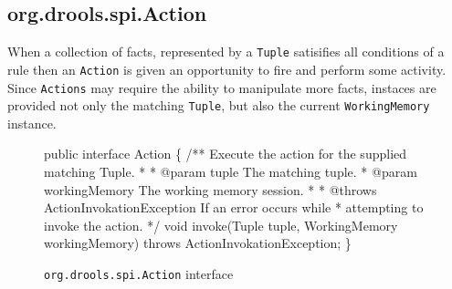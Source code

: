 \subsection{org.drools.spi.Action}

When a collection of facts, represented by a \verb|Tuple| satisifies
all conditions of a rule then an \verb|Action| is given an opportunity
to fire and perform some activity.  Since \verb|Actions| may require
the ability to manipulate more facts, instaces are provided not only
the matching \verb|Tuple|, but also the current \verb|WorkingMemory|
instance.

\begin{figure}
\begin{codelisting}
public interface Action
\{
    /** Execute the action for the supplied matching Tuple.
     *
     *  @param tuple The matching tuple.
     *  @param workingMemory The working memory session.
     *
     *  @throws ActionInvokationException If an error occurs while
     *          attempting to invoke the action.
     */
    void invoke(Tuple tuple,
                WorkingMemory workingMemory) throws ActionInvokationException;
\}
\end{codelisting}
\label{code.Action}
\caption{\texttt{org.drools.spi.Action} interface}
\end{figure}

\newpage
